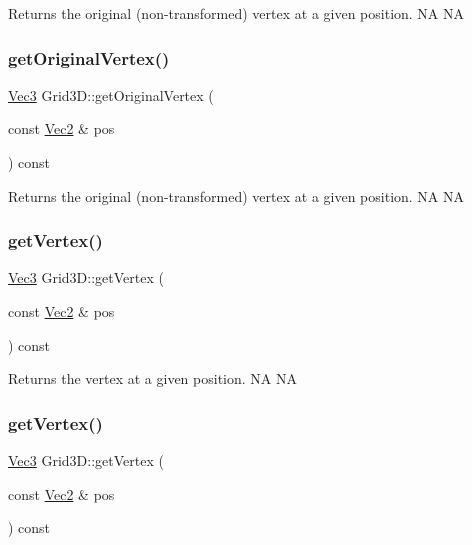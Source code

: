 Returns the original (non-\/transformed) vertex at a given position.  NA  NA \mbox{\label{classGrid3D_a02428c7bc60ac15aa12448bb63613647}} 
\subsubsection{\texorpdfstring{get\+Original\+Vertex()}{getOriginalVertex()}\hspace{0.1cm}{\footnotesize\ttfamily [2/2]}}
{\footnotesize\ttfamily \hyperlink{classVec3}{Vec3} Grid3\+D\+::get\+Original\+Vertex (\begin{DoxyParamCaption}\item[{const \hyperlink{classVec2}{Vec2} \&}]{pos }\end{DoxyParamCaption}) const}

Returns the original (non-\/transformed) vertex at a given position.  NA  NA \mbox{\label{classGrid3D_aa39962eba8aa705b6b45115ff74a0c6a}} 
\subsubsection{\texorpdfstring{get\+Vertex()}{getVertex()}\hspace{0.1cm}{\footnotesize\ttfamily [1/2]}}
{\footnotesize\ttfamily \hyperlink{classVec3}{Vec3} Grid3\+D\+::get\+Vertex (\begin{DoxyParamCaption}\item[{const \hyperlink{classVec2}{Vec2} \&}]{pos }\end{DoxyParamCaption}) const}

Returns the vertex at a given position.  NA  NA \mbox{\label{classGrid3D_aa39962eba8aa705b6b45115ff74a0c6a}} 
\subsubsection{\texorpdfstring{get\+Vertex()}{getVertex()}\hspace{0.1cm}{\footnotesize\ttfamily [2/2]}}
{\footnotesize\ttfamily \hyperlink{classVec3}{Vec3} Grid3\+D\+::get\+Vertex (\begin{DoxyParamCaption}\item[{const \hyperlink{classVec2}{Vec2} \&}]{pos }\end{DoxyParamCaption}) const}

